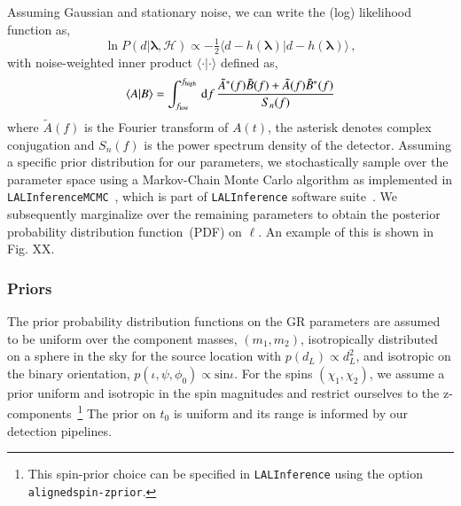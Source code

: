 \documentclass[twocolumn,
               prd,
               aps,
               superscriptaddress,
               tightenlines,
               nofootinbib,
               eqsecnum,
               amsfonts,
               amsmath,
               longbibliography]{revtex4-1}
\newcommand{\dd}{{\rm d}}
\begin{document}

Assuming Gaussian and stationary noise, we can write the (log) likelihood function as,
%
\begin{equation}
\ln P(d \vert \bm{\lambda},\mathcal{H}) \propto
- \tfrac{1}{2}
\langle
d - h(\bm{\lambda}) \vert d - h(\bm{\lambda})
\rangle\,,
\end{equation}
%
with noise-weighted inner product $\langle \cdot | \cdot \rangle$ defined as,
%
\begin{equation}
\langle A | B \rangle =
\int_{f_{\rm low}}^{f_{\rm high}} \, \dd f \,
\frac{\tilde{A}^{\ast}(f) \tilde{B}(f) + \tilde{A}(f) \tilde{B}^{\ast}(f)}{S_{n}(f)}
\end{equation}
%
where $\tilde{A}(f)$ is the Fourier transform of $A(t)$, the asterisk denotes
complex conjugation and $S_{n}(f)$ is the power spectrum density of the
detector.
%
Assuming a specific prior distribution for our parameters, we stochastically
sample over the parameter space using a Markov-Chain Monte Carlo algorithm as implemented in
\texttt{LALInferenceMCMC}~\cite{Rover:2006ni,vanderSluys:2008qx},
which is part of \texttt{LALInference} software suite~\cite{Veitch:2014wba,lalsuite}.
%
We subsequently marginalize over the remaining parameters to obtain the
posterior probability distribution function~(PDF) on $\ell$.
%
An example of this is shown in Fig. XX.

\subsubsection{Priors}

The prior probability distribution functions on the GR parameters are assumed to be uniform over the component masses, $(m_1, m_2)$, isotropically distributed on a sphere in the sky for the source location with $p(d_L) \propto d_L^2$, and isotropic on the binary orientation, $p(\iota, \psi, \phi_0) \propto \text{sin} \iota$. For the spins $(\chi_1, \chi_2)$, we assume a prior uniform and isotropic in the spin magnitudes and restrict ourselves to the z-components~\footnote{This spin-prior choice can be specified in \texttt{LALInference} using the option \texttt{alignedspin-zprior}.} The prior on $t_0$ is uniform and its range is informed by our detection pipelines.
\end{document}
